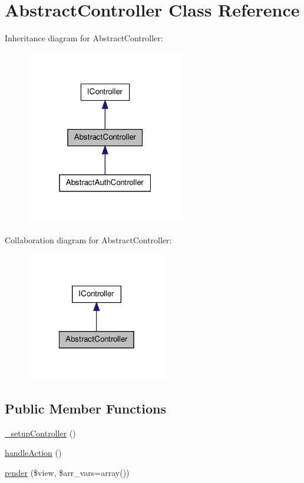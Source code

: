 \hypertarget{class_sec_plus_1_1_abstract_controller}{
\section{AbstractController Class Reference}
\label{class_sec_plus_1_1_abstract_controller}
}


Inheritance diagram for AbstractController:\nopagebreak
\begin{figure}[H]
\begin{center}
\leavevmode
\includegraphics[width=196pt]{class_sec_plus_1_1_abstract_controller__inherit__graph}
\end{center}
\end{figure}


Collaboration diagram for AbstractController:\nopagebreak
\begin{figure}[H]
\begin{center}
\leavevmode
\includegraphics[width=174pt]{class_sec_plus_1_1_abstract_controller__coll__graph}
\end{center}
\end{figure}
\subsection*{Public Member Functions}
\begin{DoxyCompactItemize}
\item 
\hyperlink{class_sec_plus_1_1_abstract_controller_aaea51da477f979105350d62a6a213bf8}{\_\-setupController} ()
\item 
\hyperlink{class_sec_plus_1_1_abstract_controller_aed6cc3b0ceef7b2c94e31be0c01269f1}{handleAction} ()
\item 
\hyperlink{class_sec_plus_1_1_abstract_controller_abe9ca2245705c74dc5d6a1a69a68539b}{render} (\$view, \$arr\_\-vars=array())
\end{DoxyCompactItemize}
